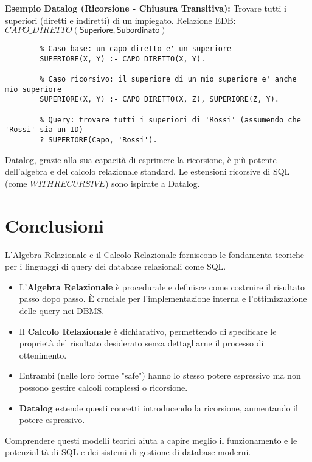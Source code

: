 \documentclass{article}
\newcommand{\Rel}[1]{\textit{#1}} %
\newcommand{\Attr}[1]{\textsf{#1}} %
\begin{document}
	\textbf{Esempio Datalog (Ricorsione - Chiusura Transitiva):} Trovare tutti i superiori (diretti e indiretti) di un impiegato.
	Relazione EDB: $\Rel{CAPO\_DIRETTO}(\Attr{Superiore}, \Attr{Subordinato})$
	\begin{verbatim}
		% Caso base: un capo diretto e' un superiore
		SUPERIORE(X, Y) :- CAPO_DIRETTO(X, Y).
		
		% Caso ricorsivo: il superiore di un mio superiore e' anche mio superiore
		SUPERIORE(X, Y) :- CAPO_DIRETTO(X, Z), SUPERIORE(Z, Y).
		
		% Query: trovare tutti i superiori di 'Rossi' (assumendo che 'Rossi' sia un ID)
		? SUPERIORE(Capo, 'Rossi').
	\end{verbatim}
	Datalog, grazie alla sua capacità di esprimere la ricorsione, è più potente dell'algebra e del calcolo relazionale standard. Le estensioni ricorsive di SQL (come $WITH RECURSIVE$) sono ispirate a Datalog.
	
	\section{Conclusioni}
	L'Algebra Relazionale e il Calcolo Relazionale forniscono le fondamenta teoriche per i linguaggi di query dei database relazionali come SQL.
	\begin{itemize}
		\item L'\textbf{Algebra Relazionale} è procedurale e definisce come costruire il risultato passo dopo passo. È cruciale per l'implementazione interna e l'ottimizzazione delle query nei DBMS.
		\item Il \textbf{Calcolo Relazionale} è dichiarativo, permettendo di specificare le proprietà del risultato desiderato senza dettagliarne il processo di ottenimento.
		\item Entrambi (nelle loro forme "safe") hanno lo stesso potere espressivo ma non possono gestire calcoli complessi o ricorsione.
		\item \textbf{Datalog} estende questi concetti introducendo la ricorsione, aumentando il potere espressivo.
	\end{itemize}
	Comprendere questi modelli teorici aiuta a capire meglio il funzionamento e le potenzialità di SQL e dei sistemi di gestione di database moderni.
	
\end{document}
